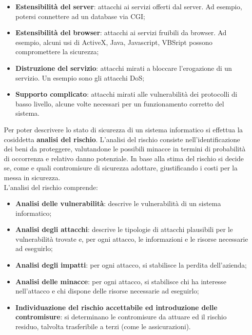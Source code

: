     \begin{itemize}
        \item \textbf{Estensibilità del server}: attacchi ai servizi offerti dal server. Ad esempio, potersi
        connettere ad un database via CGI;
        \item \textbf{Estensibilità del browser}: attacchi ai servizi fruibili da browser. Ad esempio, alcuni usi
        di ActiveX, Java, Javascript, VBSript possono compromettere la sicurezza;
        \item \textbf{Distruzione del servizio}: attacchi mirati a bloccare l’erogazione di un servizio. Un
        esempio sono gli attacchi DoS;
        \item \textbf{Supporto complicato}: attacchi mirati alle vulnerabilità dei protocolli di basso livello,
        alcune volte necessari per un funzionamento corretto del sistema.
    \end{itemize}

    Per poter descrivere lo stato di sicurezza di un sistema informatico si effettua la cosiddetta
    \textbf{analisi del rischio}. L’analisi del rischio consiste nell’identificazione dei beni da proteggere,
    valutandone le possibili minacce in termini di probabilità di occorrenza e relativo danno
    potenziale. In base alla stima del rischio si decide se, come e quali contromisure di sicurezza
    adottare, giustificando i costi per la messa in sicurezza.\\

    L’analisi del rischio comprende:

    \begin{itemize}
        \item \textbf{Analisi delle vulnerabilità}: descrive le vulnerabilità di un sistema informatico;
        \item \textbf{Analisi degli attacchi}: descrive le tipologie di attacchi plausibili per le vulnerabilità
        trovate e, per ogni attacco, le informazioni e le risorse necessarie ad eseguirlo;
        \item \textbf{Analisi degli impatti}: per ogni attacco, si stabilisce la perdita dell’azienda;
        \item \textbf{Analisi delle minacce}: per ogni attacco, si stabilisce chi ha interesse nell’attacco e chi
        dispone delle risorse necessarie ad eseguirlo;
        \item \textbf{Individuazione del rischio accettabile ed introduzione delle contromisure}: si
        determinano le contromisure da attuare ed il rischio residuo, talvolta trasferibile a terzi
        (come le assicurazioni).
    \end{itemize}


